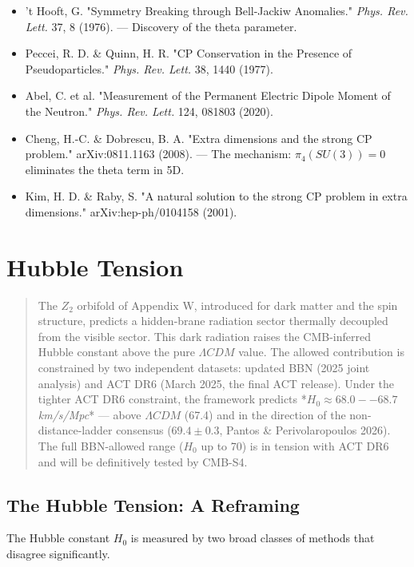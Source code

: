 \documentclass[aps,prd,preprint,superscriptaddress,longbibliography,floatfix]{revtex4-2}
\theoremstyle{remark}
\begin{document}
\begin{itemize}
  \item 't Hooft, G. "Symmetry Breaking through Bell-Jackiw Anomalies." \textit{Phys. Rev. Lett.} 37, 8 (1976). --- Discovery of the theta parameter.
  \item Peccei, R. D. \& Quinn, H. R. "CP Conservation in the Presence of Pseudoparticles." \textit{Phys. Rev. Lett.} 38, 1440 (1977).
  \item Abel, C. et al. "Measurement of the Permanent Electric Dipole Moment of the Neutron." \textit{Phys. Rev. Lett.} 124, 081803 (2020).
  \item Cheng, H.-C. \& Dobrescu, B. A. "Extra dimensions and the strong CP problem." arXiv:0811.1163 (2008). --- The mechanism: $\pi_{4}(SU(3)) = 0$ eliminates the theta term in 5D.
  \item Kim, H. D. \& Raby, S. "A natural solution to the strong CP problem in extra dimensions." arXiv:hep-ph/0104158 (2001).
\end{itemize}


\section{Hubble Tension}


\begin{quote}
The $Z_{2}$ orbifold of Appendix W, introduced for dark matter and the spin
structure, predicts a hidden-brane radiation sector thermally decoupled
from the visible sector. This dark radiation raises the CMB-inferred
Hubble constant above the pure $\Lambda CDM$ value. The allowed contribution is
constrained by two independent datasets: updated BBN (2025 joint
analysis) and ACT DR6 (March 2025, the final ACT release). Under the
tighter ACT DR6 constraint, the framework predicts *\textit{$H_{0} \approx 68.0--68.7$
km/s/Mpc}* --- above $\Lambda CDM$ (67.4) and in the direction of the
non-distance-ladder consensus ($69.4 \pm 0.3$, Pantos \& Perivolaropoulos
2026). The full BBN-allowed range ($H_{0}$ up to 70) is in tension with
ACT DR6 and will be definitively tested by CMB-S4.
\end{quote}



\subsection{The Hubble Tension: A Reframing}

The Hubble constant $H_{0}$ is measured by two broad classes of methods that disagree significantly.
\end{document}
